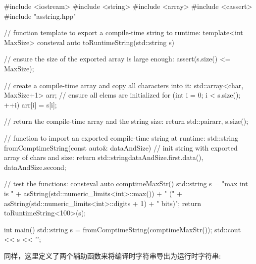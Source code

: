 \begin{cpp}
#include <iostream>
#include <string>
#include <array>
#include <cassert>
#include "asstring.hpp"

// function template to export a compile-time string to runtime:
template<int MaxSize>
consteval auto toRuntimeString(std::string s)
{
	// ensure the size of the exported array is large enough:
	assert(s.size() <= MaxSize);

	// create a compile-time array and copy all characters into it:
	std::array<char, MaxSize+1> arr{}; // ensure all elems are initialized
	for (int i = 0; i < s.size(); ++i) {
		arr[i] = s[i];
	}

	// return the compile-time array and the string size:
	return std::pair{arr, s.size()};
}

// function to import an exported compile-time string at runtime:
std::string fromComptimeString(const auto& dataAndSize)
{
	// init string with exported array of chars and size:
	return std::string{dataAndSize.first.data(),
					   dataAndSize.second};
}

// test the functions:
consteval auto comptimeMaxStr()
{
	std::string s = "max int is " + asString(std::numeric_limits<int>::max())
					+ " (" + asString(std::numeric_limits<int>::digits + 1)
					+ " bits)";
	return toRuntimeString<100>(s);
}

int main()
{
	std::string s = fromComptimeString(comptimeMaxStr());
	std::cout << s << '\n';
}
\end{cpp}

同样，这里定义了两个辅助函数来将编译时字符串导出为运行时字符串:

